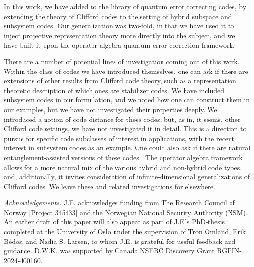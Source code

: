 \documentclass[11pt]{article}
\theoremstyle{definition}
\begin{document}
In this work, we have added to the library of quantum error correcting codes, by extending the theory of Clifford codes to the setting of hybrid subspace and subsystem codes. Our generalization was two-fold, in that we have used it to inject projective representation theory more directly into the subject, and we have built it upon the operator algebra quantum error correction framework.

There are a number of potential lines of investigation coming out of this work. Within the class of codes we have introduced themselves, one can ask if there are extensions of other results from Clifford code theory, such as a representation theoretic description of which ones are stabilizer codes. We have included subsystem codes in our formulation, and we noted how one can construct them in our examples, but we have not investigated their properties deeply. We introduced a notion of code distance for these codes, but, as in, it seems, other Clifford code settings, we have not investigated it in detail. This is a direction to pursue for specific code subclasses of interest in applications, with the recent interest in subsystem codes as an example.  One could also ask if there are natural entanglement-assisted versions of these codes \cite{NadkarniAdonsouDauphinaisKribsVasmer2024,defranco2026entanglement}. The operator algebra framework allows for a more natural mix of the various hybrid and non-hybrid code types, and, additionally, it invites consideration of infinite-dimensional generalizations of Clifford codes. We leave these and related investigations for elsewhere. 

\strut

{\noindent}{\it Acknowledgements.}
J.E. acknowledges funding from The Research Council of Norway [Project 345433] and the Norwegian National Security Authority (NSM). An earlier draft of this paper will also appear as part of J.E.'s PhD-thesis completed at the University of Oslo under the supervision of Tron Omland, Erik B\'{e}dos, and Nadia S. Larsen, to whom J.E. is grateful for useful feedback and guidance.
D.W.K. was supported by Canada NSERC Discovery Grant RGPIN-2024-400160.




\end{document}
